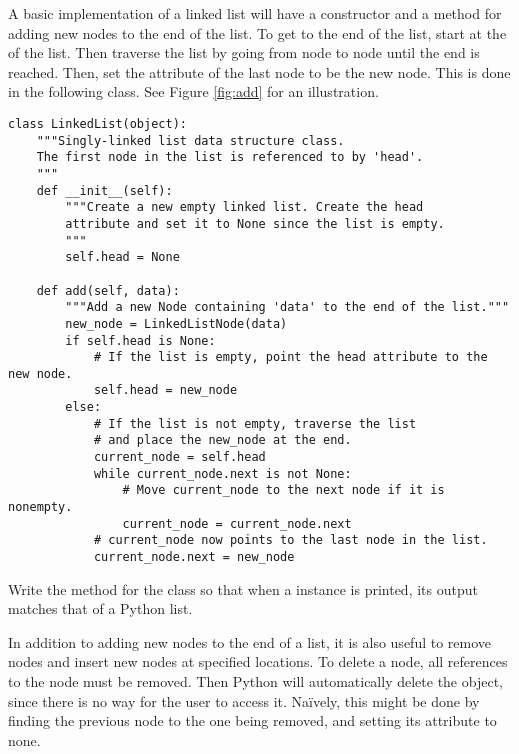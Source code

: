 A basic implementation of a linked list will have a constructor and a method for adding new nodes to the end of the list.
To get to the end of the list, start at the  of the list.
Then traverse the list by going from node to node until the end is reached.
Then, set the  attribute of the last node to be the new node.
This is done in the following class.
See Figure \ref{fig:add} for an illustration.

\begin{lstlisting}
class LinkedList(object):
	"""Singly-linked list data structure class.
	The first node in the list is referenced to by 'head'.
	"""
	def __init__(self):
		"""Create a new empty linked list. Create the head
		attribute and set it to None since the list is empty.
		"""
		self.head = None

	def add(self, data):
		"""Add a new Node containing 'data' to the end of the list."""
		new_node = LinkedListNode(data)
		if self.head is None:
			# If the list is empty, point the head attribute to the new node.
			self.head = new_node
		else:
			# If the list is not empty, traverse the list
			# and place the new_node at the end.
			current_node = self.head
			while current_node.next is not None:
				# Move current_node to the next node if it is nonempty.
				current_node = current_node.next
			# current_node now points to the last node in the list.
			current_node.next = new_node
\end{lstlisting}

\begin{problem}
Write the  method for the  class so that when a  instance is printed, its output matches that of a Python list.
\end{problem}

In addition to adding new nodes to the end of a list, it is also useful to remove nodes and insert new nodes at specified locations.
To delete a node, all references to the node must be removed.
Then Python will automatically delete the object, since there is no way for the user to access it.
Na{\"i}vely, this might be done by finding the previous node to the one being removed, and setting its  attribute to none.

